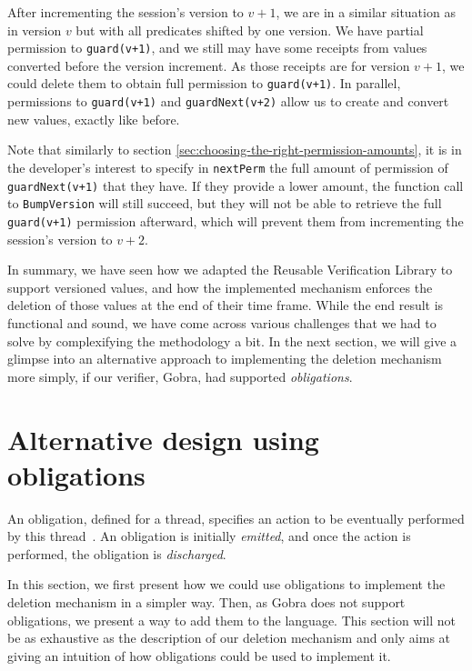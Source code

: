 After incrementing the session's version to $v+1$, we are in a similar situation as in version $v$ but with all predicates shifted by one version.
We have partial permission to \texttt{guard(v+1)}, and we still may have some receipts from values converted before the version increment.
As those receipts are for version $v+1$, we could delete them to obtain full permission to \texttt{guard(v+1)}.
In parallel, permissions to \texttt{guard(v+1)} and \texttt{guardNext(v+2)} allow us to create and convert new values, exactly like before.

Note that similarly to section \ref{sec:choosing-the-right-permission-amounts}, it is in the developer's interest to specify in \texttt{nextPerm} the full amount of permission of \texttt{guardNext(v+1)} that they have. If they provide a lower amount, the function call to \texttt{BumpVersion} will still succeed, but they will not be able to retrieve the full \texttt{guard(v+1)} permission afterward, which will prevent them from incrementing the session's version to $v+2$.


In summary, we have seen how we adapted the Reusable Verification Library to support versioned values, and how the implemented mechanism enforces the deletion of those values at the end of their time frame.
While the end result is functional and sound, we have come across various challenges that we had to solve by complexifying the methodology a bit.
In the next section, we will give a glimpse into an alternative approach to implementing the deletion mechanism more simply, if our verifier, Gobra, had supported \emph{obligations}.

\section{Alternative design using obligations}

An obligation, defined for a thread, specifies an action to be eventually performed by this thread~\cite{}. An obligation is initially \emph{emitted}, and once the action is performed, the obligation is \emph{discharged}.

In this section, we first present how we could use obligations to implement the deletion mechanism in a simpler way.
Then, as Gobra does not support obligations, we present a way to add them to the language.
This section will not be as exhaustive as the description of our deletion mechanism and only aims at giving an intuition of how obligations could be used to implement it.

